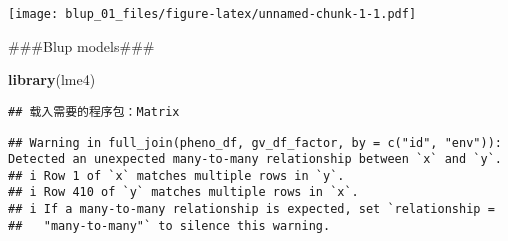 \documentclass[
]{article}
\newenvironment{Shaded}{\begin{snugshade}}{\end{snugshade}}
\newcommand{\AttributeTok}[1]{\textcolor[rgb]{0.13,0.29,0.53}{#1}}
\newcommand{\CommentTok}[1]{\textcolor[rgb]{0.56,0.35,0.01}{\textit{#1}}}
\newcommand{\FunctionTok}[1]{\textcolor[rgb]{0.13,0.29,0.53}{\textbf{#1}}}
\newcommand{\NormalTok}[1]{#1}
\newcommand{\OtherTok}[1]{\textcolor[rgb]{0.56,0.35,0.01}{#1}}
\newcommand{\SpecialCharTok}[1]{\textcolor[rgb]{0.81,0.36,0.00}{\textbf{#1}}}
\newcommand{\StringTok}[1]{\textcolor[rgb]{0.31,0.60,0.02}{#1}}
\begin{document}
\texttt{[image: blup\_01\_files/figure-latex/unnamed-chunk-1-1.pdf]}

\#\#\#Blup models\#\#\#

\begin{Shaded}
\begin{Highlighting}[]
\FunctionTok{library}\NormalTok{(lme4)}
\end{Highlighting}
\end{Shaded}

\begin{verbatim}
## 载入需要的程序包：Matrix
\end{verbatim}

\begin{Shaded}
\end{Shaded}

\begin{verbatim}
## Warning in full_join(pheno_df, gv_df_factor, by = c("id", "env")): Detected an unexpected many-to-many relationship between `x` and `y`.
## i Row 1 of `x` matches multiple rows in `y`.
## i Row 410 of `y` matches multiple rows in `x`.
## i If a many-to-many relationship is expected, set `relationship =
##   "many-to-many"` to silence this warning.
\end{verbatim}

\begin{Shaded}
\end{Shaded}
\end{document}
